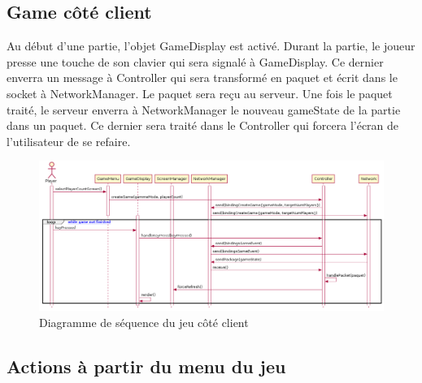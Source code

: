 \documentclass{article}
\begin{document}
\subsection{Game côté client}

Au début d'une partie, l'objet GameDisplay est activé. Durant la partie, le joueur presse une touche de son clavier qui sera signalé à GameDisplay. Ce dernier enverra un message à Controller qui sera transformé en paquet et écrit dans le socket à NetworkManager. Le paquet sera reçu au serveur. Une fois le paquet traité, le serveur enverra à NetworkManager le nouveau gameState de la partie dans un paquet. Ce dernier sera traité dans le Controller qui forcera l'écran de l'utilisateur de se refaire.

\begin{figure}[H]
    \centering
    \includegraphics[width=1\textwidth]{../res/uml/sequence/GameClientSequence.png}
    \caption{Diagramme de séquence du jeu côté client}
    \label{fig:GameClientSeqDiagram}
\end{figure}

\subsection{Actions à partir du menu du jeu}




\end{document}
